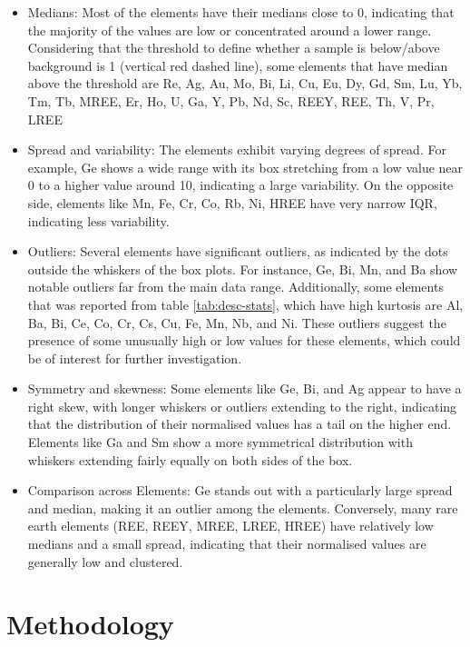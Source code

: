\documentclass[11pt,a4paper,]{article}
\providecommand{\tightlist}{%
  \setlength{\itemsep}{0pt}\setlength{\parskip}{0pt}}
\begin{document}
\begin{itemize}
\tightlist
\item
  Medians: Most of the elements have their medians close to 0, indicating that the majority of the values are low or concentrated around a lower range. Considering that the threshold to define whether a sample is below/above background is 1 (vertical red dashed line), some elements that have median above the threshold are Re, Ag, Au, Mo, Bi, Li, Cu, Eu, Dy, Gd, Sm, Lu, Yb, Tm, Tb, MREE, Er, Ho, U, Ga, Y, Pb, Nd, Sc, REEY, REE, Th, V, Pr, LREE
\item
  Spread and variability: The elements exhibit varying degrees of spread. For example, Ge shows a wide range with its box stretching from a low value near 0 to a higher value around 10, indicating a large variability. On the opposite side, elements like Mn, Fe, Cr, Co, Rb, Ni, HREE have very narrow IQR, indicating less variability.
\item
  Outliers: Several elements have significant outliers, as indicated by the dots outside the whiskers of the box plots. For instance, Ge, Bi, Mn, and Ba show notable outliers far from the main data range. Additionally, some elements that was reported from table \ref{tab:desc-stats}, which have high kurtosis are Al, Ba, Bi, Ce, Co, Cr, Cs, Cu, Fe, Mn, Nb, and Ni. These outliers suggest the presence of some unusually high or low values for these elements, which could be of interest for further investigation.
\item
  Symmetry and skewness: Some elements like Ge, Bi, and Ag appear to have a right skew, with longer whiskers or outliers extending to the right, indicating that the distribution of their normalised values has a tail on the higher end. Elements like Ga and Sm show a more symmetrical distribution with whiskers extending fairly equally on both sides of the box.
\item
  Comparison across Elements: Ge stands out with a particularly large spread and median, making it an outlier among the elements. Conversely, many rare earth elements (REE, REEY, MREE, LREE, HREE) have relatively low medians and a small spread, indicating that their normalised values are generally low and clustered.
\end{itemize}

\section{Methodology}\label{methodology}
\end{document}
